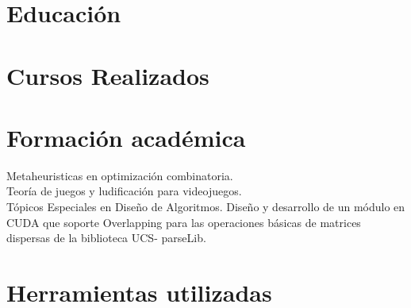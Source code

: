 \documentclass[letterpaper]{twentysecondcv} %
\begin{document}
\section{Educación}

\begin{twenty} %
\end{twenty}


\section{Cursos Realizados}

\begin{twenty}
\end{twenty}

\section{Formación académica}

\begin{twentyshort} %
	{
		Metaheuristicas en optimización combinatoria. \\ 
		Teoría de juegos y ludificación para videojuegos. \\
		Tópicos Especiales en Diseño de Algoritmos.
	}
	{\normalfont
		Diseño y desarrollo de un módulo en CUDA que soporte Overlapping para las
		operaciones básicas de matrices dispersas de la biblioteca UCS- parseLib.
	}
\end{twentyshort}

\section{Herramientas utilizadas} \\
\end{document}
